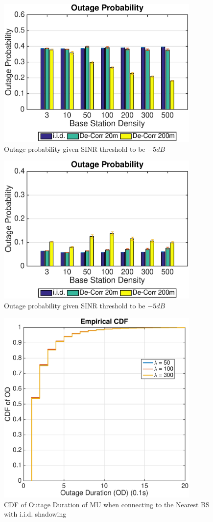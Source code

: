 \begin{figure}
\centering
\includegraphics[width=10cm]{NBMax1000OutageProbThresh-5iid.eps}
\caption{Outage probability given SINR threshold to be $-5dB$}
\label{fig: outprob1}
\end{figure}
\begin{figure}
\centering
\includegraphics[width=10cm]{MaxMax1000OutageProbThresh-5iid.eps}
\caption{Outage probability given SINR threshold to be $-5dB$}
\label{fig: outprobs2}
\end{figure}
\begin{figure}
\centering
\includegraphics[width=10cm]{ODthresh-5iidNB.eps}
\caption{CDF of Outage Duration of MU when connecting to the Nearest BS with i.i.d. shadowing}
\label{iid1}
\end{figure}
